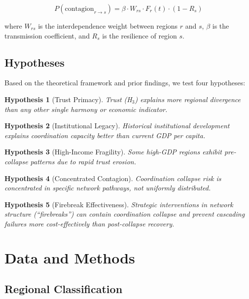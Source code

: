 \documentclass[12pt,a4paper]{article}
\newtheorem{hypothesis}{Hypothesis}
\begin{document}
\begin{equation}
P(\text{contagion}_{r \to s}) = \beta \cdot W_{rs} \cdot F_r(t) \cdot (1 - R_s)
\end{equation}

where $W_{rs}$ is the interdependence weight between regions $r$ and $s$, $\beta$ is the transmission coefficient, and $R_s$ is the resilience of region $s$.

\subsection{Hypotheses}

Based on the theoretical framework and prior findings, we test four hypotheses:

\begin{hypothesis}[Trust Primacy]
Trust (H$_3$) explains more regional divergence than any other single harmony or economic indicator.
\end{hypothesis}

\begin{hypothesis}[Institutional Legacy]
Historical institutional development explains coordination capacity better than current GDP per capita.
\end{hypothesis}

\begin{hypothesis}[High-Income Fragility]
Some high-GDP regions exhibit pre-collapse patterns due to rapid trust erosion.
\end{hypothesis}

\begin{hypothesis}[Concentrated Contagion]
Coordination collapse risk is concentrated in specific network pathways, not uniformly distributed.
\end{hypothesis}

\begin{hypothesis}[Firebreak Effectiveness]
Strategic interventions in network structure (``firebreaks'') can contain coordination collapse and prevent cascading failures more cost-effectively than post-collapse recovery.
\end{hypothesis}

\section{Data and Methods}
\label{sec:methods}

\subsection{Regional Classification}
\end{document}
